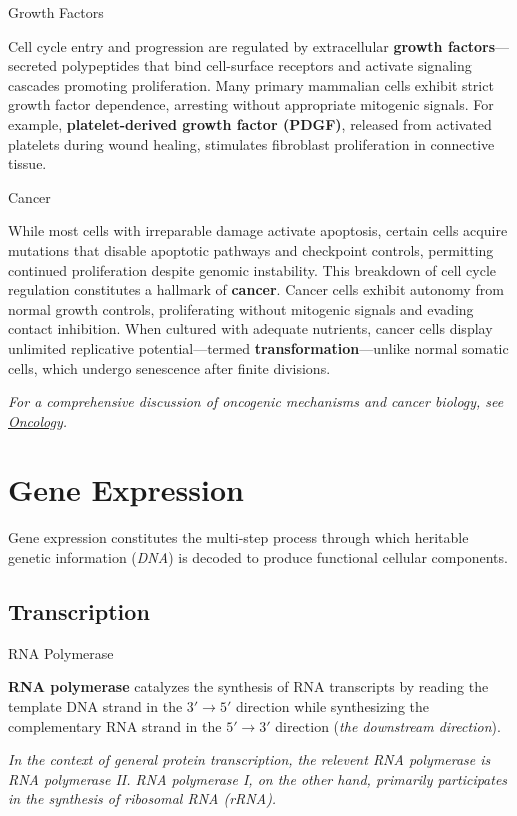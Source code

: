\documentclass[10pt]{article}
\begin{document}
    \begin{core}{Growth Factors}

      Cell cycle entry and progression are regulated by extracellular \textbf{growth factors}---secreted polypeptides that bind cell-surface receptors and activate signaling cascades promoting proliferation. Many primary mammalian cells exhibit strict growth factor dependence, arresting without appropriate mitogenic signals. For example, \textbf{platelet-derived growth factor (PDGF)}, released from activated platelets during wound healing, stimulates fibroblast proliferation in connective tissue.

    \end{core}
    
    \begin{core}{Cancer}

      While most cells with irreparable damage activate apoptosis, certain cells acquire mutations that disable apoptotic pathways and checkpoint controls, permitting continued proliferation despite genomic instability. This breakdown of cell cycle regulation constitutes a hallmark of \textbf{cancer}. Cancer cells exhibit autonomy from normal growth controls, proliferating without mitogenic signals and evading contact inhibition. When cultured with adequate nutrients, cancer cells display unlimited replicative potential---termed \textbf{transformation}---unlike normal somatic cells, which undergo senescence after finite divisions.

      \textit{For a comprehensive discussion of oncogenic mechanisms and cancer biology, see \href{https://ibahng.github.io/biology/oncology/oncology.pdf}{Oncology}.}

    \end{core}
 
\section{Gene Expression}
  \label{sec:gene_expression}

  Gene expression constitutes the multi-step process through which heritable genetic information (\textit{DNA}) is decoded to produce functional cellular components.

  \subsection{Transcription}

    \begin{core}{RNA Polymerase}
 
      \textbf{RNA polymerase} catalyzes the synthesis of RNA transcripts by reading the template DNA strand in the $3' \to 5'$ direction while synthesizing the complementary RNA strand in the $5' \to 3'$ direction (\textit{the downstream direction}).

      \textit{In the context of general protein transcription, the relevent RNA polymerase is RNA polymerase II. RNA polymerase I, on the other hand, primarily participates in the synthesis of ribosomal RNA (rRNA).}

    \end{core}
\end{document}
